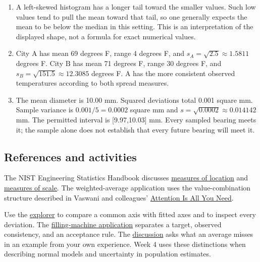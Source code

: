 \begin{enumerate}[label=R\arabic*.,leftmargin=2.5em,itemsep=10pt]
\item A left-skewed histogram has a longer tail toward the smaller values. Such low values tend to pull the mean toward that tail, so one generally expects the mean to be below the median in this setting. This is an interpretation of the displayed shape, not a formula for exact numerical values.
\item City A has mean 69 degrees F, range 4 degrees F, and $s_A=\sqrt{2.5}\approx1.5811$ degrees F. City B has mean 71 degrees F, range 30 degrees F, and $s_B=\sqrt{151.5}\approx12.3085$ degrees F. A has the more consistent observed temperatures according to both spread measures.
\item The mean diameter is 10.00 mm. Squared deviations total 0.001 square mm. Sample variance is $0.001/5=0.0002$ square mm and $s=\sqrt{0.0002}\approx0.014142$ mm. The permitted interval is [9.97,10.03] mm. Every sampled bearing meets it; the sample alone does not establish that every future bearing will meet it.
\end{enumerate}

\subsection*{References and activities}
The NIST Engineering Statistics Handbook discusses \href{https://www.itl.nist.gov/div898/handbook/eda/section3/eda351.htm}{measures of location} and \href{https://www.itl.nist.gov/div898/handbook/eda/section3/eda356.htm}{measures of scale}. The weighted-average application uses the value-combination structure described in Vaswani and colleagues' \href{https://arxiv.org/html/1706.03762v7}{Attention Is All You Need}.

Use the \href{https://bobovski66.github.io/MathInSociety/demos/center_spread.html}{explorer} to compare a common axis with fitted axes and to inspect every deviation. The \href{https://bobovski66.github.io/MathInSociety/applications/week3_application.html}{filling-machine application} separates a target, observed consistency, and an acceptance rule. The \href{https://bobovski66.github.io/MathInSociety/discussions/week3_discussion.html}{discussion} asks what an average misses in an example from your own experience. Week 4 uses these distinctions when describing normal models and uncertainty in population estimates.
